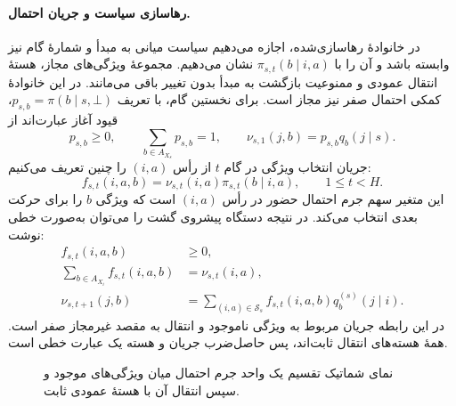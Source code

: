 \paragraph{رهاسازی سیاست و جریان احتمال.}
در خانوادهٔ رهاسازی‌شده، اجازه می‌دهیم سیاست میانی به مبدأ و شمارهٔ گام نیز وابسته باشد و آن را با $\pi_{s,t}(b\mid i,a)$ نشان می‌دهیم. مجموعهٔ ویژگی‌های مجاز، هستهٔ انتقال عمودی و ممنوعیت بازگشت به مبدأ بدون تغییر باقی می‌مانند. در این خانوادهٔ کمکی احتمال صفر نیز مجاز است. برای نخستین گام، با تعریف $p_{s,b}=\pi(b\mid s,\bot)$، قیود آغاز عبارت‌اند از
\begin{equation}\label{cmp:eq:ch3-geometry-flow-initial}
p_{s,b}\ge0,\qquad\sum_{b\in A_{X_s}}p_{s,b}=1,\qquad
\nu_{s,1}(j,b)=p_{s,b}q_b(j\mid s).
\end{equation}
جریان انتخاب ویژگی در گام $t$ از رأس $(i,a)$ را چنین تعریف می‌کنیم:
\begin{equation}\label{cmp:eq:ch3-geometry-flow-definition}
f_{s,t}(i,a,b)=\nu_{s,t}(i,a)\pi_{s,t}(b\mid i,a),\qquad 1\le t<H.
\end{equation}
این متغیر سهم جرم احتمال حضور در رأس $(i,a)$ است که ویژگی $b$ را برای حرکت بعدی انتخاب می‌کند. در نتیجه دستگاه پیشروی گشت را می‌توان به‌صورت خطی نوشت:
\begin{equation}\label{cmp:eq:ch3-geometry-flow-constraints}
\boxed{\begin{aligned}
f_{s,t}(i,a,b)&\ge0,\\
\sum_{b\in A_{X_i}}f_{s,t}(i,a,b)&=\nu_{s,t}(i,a),\\
\nu_{s,t+1}(j,b)&=\sum_{(i,a)\in\mathcal S_s}f_{s,t}(i,a,b)q_b^{(s)}(j\mid i).
\end{aligned}}
\end{equation}
در این رابطه جریان مربوط به ویژگی ناموجود و انتقال به مقصد غیرمجاز صفر است. همهٔ هسته‌های انتقال ثابت‌اند، پس حاصل‌ضرب جریان و هسته یک عبارت خطی است.

\begin{figure}[!htbp]
\centering
\begin{LTR}
\end{LTR}
\caption{نمای شماتیک تقسیم یک واحد جرم احتمال میان ویژگی‌های موجود و سپس انتقال آن با هستهٔ عمودی ثابت.}
\label{cmp:fig:ch3-geometry-probability-flow}
\end{figure}

